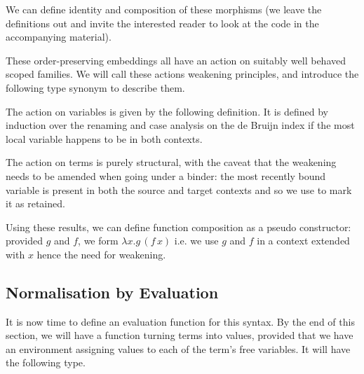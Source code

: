 \documentclass{article}
\begin{document}
We can define identity and composition of these morphisms (we leave
the definitions out and invite the interested reader to look
at the code in the accompanying material).

\noindent
\begin{minipage}{.3\textwidth}
\end{minipage}\hfill
\begin{minipage}{.5\textwidth}
\end{minipage}

These order-preserving embeddings all have an action on suitably
well behaved scoped families. We will call these actions weakening
principles, and introduce the following type synonym to describe them.


The action on variables is given
by the following  definition. It is defined by
induction over the renaming and case analysis on the de Bruijn
index if the most local variable happens to be in both contexts.


The action on terms is purely structural, with the caveat that
the weakening needs to be amended when going under a binder: the
most recently bound variable is present in both the source and
target contexts and so we use  to mark it as retained.


Using these results, we can define function composition
as a pseudo constructor: provided $g$ and $f$, we form
$λx.g\,(f\, x)$ i.e. we use $g$ and $f$ in a context extended
with $x$ hence the need for weakening.

\label{def:composition}

\subsection{Normalisation by Evaluation}

It is now time to define an evaluation function for this syntax.
By the end of this section, we will have a function 
turning terms into values,
provided that we have an environment assigning values
to each of the term's free variables. It will have the following type.

\end{document}
